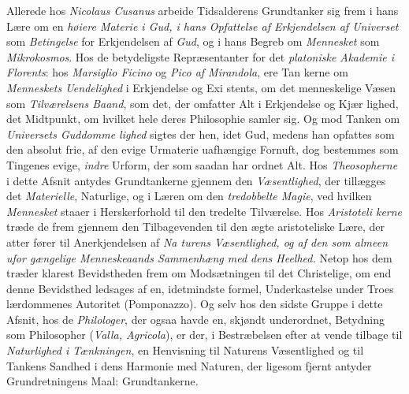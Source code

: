 Allerede hos \emph{Nicolaus Cusanus} arbeide Tidsalderens
Grundtanker sig frem i hans Lære om en \emph{høiere Materie i
Gud, i hans Opfattelse af Erkjendelsen af Universet}
som \emph{Betingelse} for Erkjendelsen af \emph{Gud}, og i hans Begreb
om \emph{Mennesket} som \emph{Mikrokosmos}. Hos de betydeligste
Repræsentanter for det \emph{platoniske Akademie i Florents}:
hos \emph{Marsiglio Ficino} og \emph{Pico af Mirandola}, ere Tan\-%
kerne om \emph{Menneskets Uendelighed} i Erkjendelse og Exi\-%
stents, om det menneskelige Væsen som \emph{Tilværelsens
Baand}, som det, der omfatter Alt i Erkjendelse og Kjær\-%
lighed, det Midtpunkt, om hvilket hele deres Philosophie
samler sig. Og mod Tanken om \emph{Universets Guddomme\-%
lighed} sigtes der hen, idet Gud, medens han opfattes som
den absolut frie, af den evige Urmaterie uafhængige Fornuft,
dog bestemmes som Tingenes evige, \emph{indre} Urform, der som
saadan har ordnet Alt. Hos \emph{Theosopherne} i dette Afsnit
antydes Grundtankerne gjennem den \emph{Væsentlighed}, der
tillægges det \emph{Materielle}, Naturlige, og i Læren om den
\emph{tredobbelte Magie}, ved hvilken \emph{Mennesket} staaer i
Herskerforhold til den tredelte Tilværelse. Hos \emph{Aristoteli\-%
kerne} træde de frem gjennem den Tilbagevenden til den ægte
aristoteliske Lære, der atter fører til Anerkjendelsen af \emph{Na\-%
turens Væsentlighed, og af den som almeen ufor\-%
\setcounter{footnote}{0}%
gængelige Menneskeaands Sammenhæng med dens
Heelhed.} Netop hos dem træder klarest Bevidstheden frem
om Modsætningen til det Christelige, om end denne Bevidsthed
ledsages af en, idetmindste formel, Underkastelse under Troes\-%
lærdommenes Autoritet (Pomponazzo). Og selv hos den sidste
Gruppe i dette Afsnit, hos de \emph{Philologer}, der ogsaa havde
en, skjøndt underordnet, Betydning som Philosopher (\emph{Valla,
Agricola}), er der, i Bestræbelsen efter at vende tilbage til
\emph{Naturlighed i Tænkningen}, en Henvisning til Naturens
Væsentlighed og til Tankens Sandhed i dens Harmonie med
Naturen, der ligesom fjernt antyder Grundretningens Maal:
Grundtankerne.

